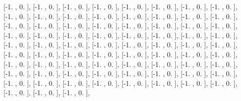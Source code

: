 \documentclass{article}
\begin{document}
       [-1.        ,  0.        ],
       [-1.        ,  0.        ],
       [-1.        ,  0.        ],
       [-1.        ,  0.        ],
       [-1.        ,  0.        ],
       [-1.        ,  0.        ],
       [-1.        ,  0.        ],
       [-1.        ,  0.        ],
       [-1.        ,  0.        ],
       [-1.        ,  0.        ],
       [-1.        ,  0.        ],
       [-1.        ,  0.        ],
       [-1.        ,  0.        ],
       [-1.        ,  0.        ],
       [-1.        ,  0.        ],
       [-1.        ,  0.        ],
       [-1.        ,  0.        ],
       [-1.        ,  0.        ],
       [-1.        ,  0.        ],
       [-1.        ,  0.        ],
       [-1.        ,  0.        ],
       [-1.        ,  0.        ],
       [-1.        ,  0.        ],
       [-1.        ,  0.        ],
       [-1.        ,  0.        ],
       [-1.        ,  0.        ],
       [-1.        ,  0.        ],
       [-1.        ,  0.        ],
       [-1.        ,  0.        ],
       [-1.        ,  0.        ],
       [-1.        ,  0.        ],
       [-1.        ,  0.        ],
       [-1.        ,  0.        ],
       [-1.        ,  0.        ],
       [-1.        ,  0.        ],
       [-1.        ,  0.        ],
       [-1.        ,  0.        ],
       [-1.        ,  0.        ],
       [-1.        ,  0.        ],
       [-1.        ,  0.        ],
       [-1.        ,  0.        ],
       [-1.        ,  0.        ],
       [-1.        ,  0.        ],
       [-1.        ,  0.        ],
       [-1.        ,  0.        ],
       [-1.        ,  0.        ],
       [-1.        ,  0.        ],
       [-1.        ,  0.        ],
       [-1.        ,  0.        ],
       [-1.        ,  0.        ],
       [-1.        ,  0.        ],
       [-1.        ,  0.        ],
       [-1.        ,  0.        ],
       [-1.        ,  0.        ],
       [-1.        ,  0.        ],
       [-1.        ,  0.        ],
       [-1.        ,  0.        ],
       [-1.        ,  0.        ],
       [-1.        ,  0.        ],
       [-1.        ,  0.        ],
       [-1.        ,  0.        ],
       [-1.        ,  0.        ],
       [-1.        ,  0.        ],
       [-1.        ,  0.        ],
       [-1.        ,  0.        ],
       [-1.        ,  0.        ],
       [-1.        ,  0.        ],
       [-1.        ,  0.        ],
       [-1.        ,  0.        ],
       [-1.        ,  0.        ],
       [-1.        ,  0.        ],
       [-1.        ,  0.        ],
       [-1.        ,  0.        ],
       [-1.        ,  0.        ],
       [-1.        ,  0.        ],
\end{document}
